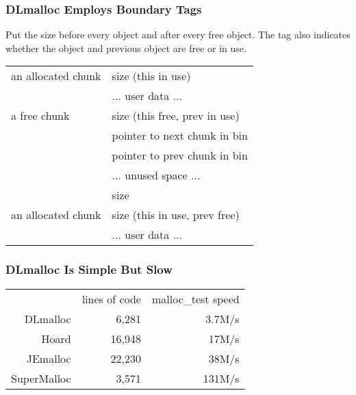 \documentclass[xcolor=dvipsnames,14pt]{beamer}
\begin{document}
\begin{frame}
\frametitle{DLmalloc Employs Boundary Tags}

Put the size before every object and after every free object.  The
tag also indicates whether the object and previous object are free or in use.

\begin{center}
\begin{tabular}{l|l|}
                                                    \hline
an allocated chunk & size (this in use)                \\ \cline{2-2}
                   & $\ldots$ user data $\ldots$ \\ \hline
a free chunk       & size (this free, prev in use)     \\ \cline{2-2}
                   & pointer to next chunk in bin \\ \cline{2-2}
                   & pointer to prev chunk in bin \\ \cline{2-2}
                   & $\ldots$ unused space $\ldots$ \\ \cline{2-2}
                   & size                        \\ \hline
an allocated chunk & size (this in use, prev free)    \\ \cline{2-2}
                   & $\ldots$ user data $\ldots$ \\ \hline
\end{tabular}
\end{center}
\end{frame}

\begin{frame}
\frametitle{DLmalloc Is Simple But Slow}

\begin{tabular}{rrr}
         & lines of code & malloc\_test speed \\
DLmalloc &    6,281 &  3.7M/s \\
Hoard    &   16,948 &  17M/s \\
JEmalloc    & 22,230 & 38M/s\\
SuperMalloc & 3,571 & 131M/s \\
\end{tabular}

\end{frame}
\end{document}
